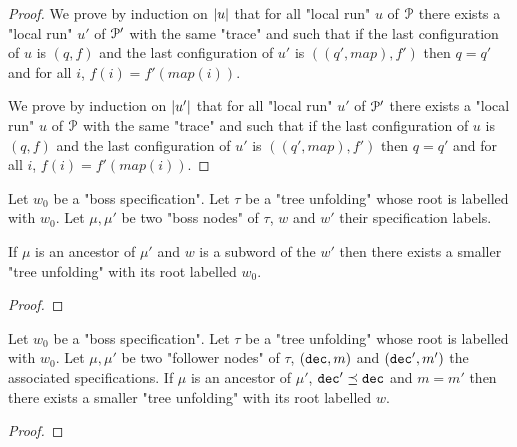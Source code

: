 \begin{proof}
	
	We prove by induction on $|u|$ that for all "local run" $u$ of $\mathcal{P}$ there exists a "local run" $u'$ of $\mathcal{P}'$ with the same "trace" and such that if the last configuration of $u$ is $(q,f)$ and the last configuration of $u'$ is $((q',map), f')$ then $q=q'$ and for all $i$, $f(i) = f'(map(i))$.  
	
	
	We prove by induction on $|u'|$ that for all "local run" $u'$ of $\mathcal{P}'$ there exists a "local run" $u$ of $\mathcal{P}$ with the same "trace" and such that if the last configuration of $u$ is $(q,f)$ and the last configuration of $u'$ is $((q',map), f')$ then $q=q'$ and for all $i$, $f(i) = f'(map(i))$.
	
\end{proof}

\begin{lemma}
	Let $w_0$ be a "boss specification".
	Let $\tau$ be a "tree unfolding" whose root is labelled with $w_0$.
	Let $\mu, \mu'$ be two "boss nodes" of $\tau$, $w$ and $w'$ their specification labels.
	
	If $\mu$ is an ancestor of $\mu'$ and $w$ is a subword of the $w'$ then there exists a smaller "tree unfolding" with its root labelled $w_0$.  
\end{lemma}

\begin{proof}
\end{proof}

\begin{lemma}
	Let $w_0$ be a "boss specification".
	Let $\tau$ be a "tree unfolding" whose root is labelled with $w_0$.
	Let $\mu, \mu'$ be two "follower nodes" of $\tau$, $(\mathtt{dec},m)$ and $(\mathtt{dec}',m')$ the associated specifications.
	If $\mu$ is an ancestor of $\mu'$, $\mathtt{dec}' \preceq \mathtt{dec}$ and $m=m'$ then there exists a smaller "tree unfolding" with its root labelled $w$.  
\end{lemma}

\begin{proof}
\end{proof}


